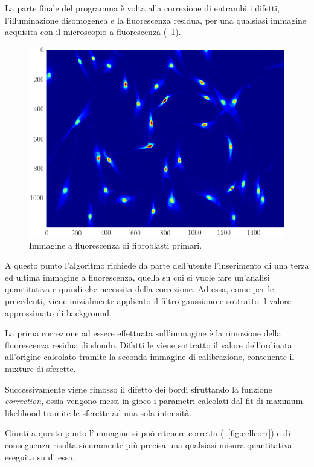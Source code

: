 La parte finale del programma è volta alla correzione di entrambi i difetti, l'illuminazione disomogenea e la fluorescenza residua, per una qualsiasi immagine acquisita con il microscopio a fluorescenza (\figurename~\ref{fig:cell}). 

\begin{figure}[p]
 \centering
 \includegraphics[scale=.64]{img/CAP3cell.png}
 \caption{\small{Immagine a fluorescenza di fibroblasti primari.}}
 \label{fig:cell}
\end{figure}

A questo punto l'algoritmo richiede da parte dell'utente l'inserimento di una terza ed ultima immagine a fluorescenza, quella su cui si vuole fare un'analisi quantitativa e quindi che necessita della correzione.
Ad essa, come per le precedenti, viene inizialmente applicato il filtro gaussiano e sottratto il valore approssimato di background.

La prima correzione ad essere effettuata sull'immagine è la rimozione della fluorescenza residua di sfondo. 
Difatti le viene sottratto il valore dell'ordinata all'origine calcolato tramite la seconda immagine di calibrazione, contenente il mixture di sferette.

Successivamente viene rimosso il difetto dei bordi sfruttando la funzione \textit{correction}, ossia vengono messi in gioco i parametri calcolati dal fit di maximum likelihood tramite le sferette ad una sola intensità.

Giunti a questo punto l'immagine si può ritenere corretta (\figurename~\ref{fig:cellcorr}) e di conseguenza risulta sicuramente più precisa una qualsiasi misura quantitativa eseguita su di essa.

